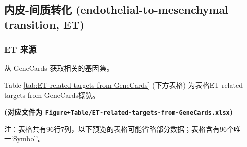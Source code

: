 \documentclass[
]{article}
\begin{document}
\hypertarget{ux5185ux76ae-ux95f4ux8d28ux8f6cux5316-endothelial-to-mesenchymal-transition-et}{%
\subsection{内皮-间质转化 (endothelial-to-mesenchymal transition, ET)}\label{ux5185ux76ae-ux95f4ux8d28ux8f6cux5316-endothelial-to-mesenchymal-transition-et}}

\hypertarget{et-ux6765ux6e90}{%
\subsubsection{ET 来源}\label{et-ux6765ux6e90}}

从 GeneCards 获取相关的基因集。

Table \ref{tab:ET-related-targets-from-GeneCards} (下方表格) 为表格ET related targets from GeneCards概览。

\textbf{(对应文件为 \texttt{Figure+Table/ET-related-targets-from-GeneCards.xlsx})}

\begin{center}\begin{tcolorbox}[colback=gray!10, colframe=gray!50, width=0.9\linewidth, arc=1mm, boxrule=0.5pt]注：表格共有96行7列，以下预览的表格可能省略部分数据；表格含有96个唯一`Symbol'。
\end{tcolorbox}
\end{center}
\end{document}
